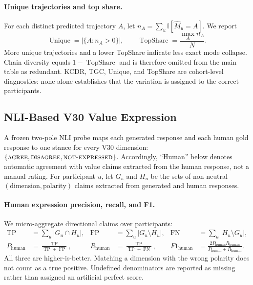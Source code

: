 \paragraph{Unique trajectories and top share.}
For each distinct predicted trajectory \(A\), let
\(n_A=\sum_u\mathbb I[\widehat M_u=A]\). We report
\begin{equation}
\operatorname{Unique}=\left|\{A:n_A>0\}\right|,
\qquad
\operatorname{TopShare}=\frac{\max_A n_A}{N}.
\label{eq:unique_topshare}
\end{equation}
More unique trajectories and a lower TopShare indicate less exact mode
collapse. Chain diversity equals \(1-\operatorname{TopShare}\) and is
therefore omitted from the main table as redundant. KCDR, TGC, Unique, and
TopShare are cohort-level diagnostics: none alone establishes that the
variation is assigned to the correct participants.

\subsection{NLI-Based V30 Value Expression}

A frozen two-pole NLI probe maps each generated response and each human gold
response to one stance for every V30 dimension:
\(\{\textsc{agree},\textsc{disagree},\textsc{not-expressed}\}\).
Accordingly, ``Human'' below denotes automatic agreement with value claims
extracted from the human response, not a manual rating. For participant \(u\),
let \(G_u\) and \(H_u\) be the sets of non-neutral
\((\text{dimension},\text{polarity})\) claims extracted from generated and
human responses.

\paragraph{Human expression precision, recall, and F1.}
We micro-aggregate directional claims over participants:
\begin{align}
\operatorname{TP}&=\sum_u|G_u\cap H_u|, &
\operatorname{FP}&=\sum_u|G_u\setminus H_u|, &
\operatorname{FN}&=\sum_u|H_u\setminus G_u|, \nonumber\\
P_{\mathrm{human}}&=\frac{\operatorname{TP}}
{\operatorname{TP}+\operatorname{FP}},&
R_{\mathrm{human}}&=\frac{\operatorname{TP}}
{\operatorname{TP}+\operatorname{FN}},&
F1_{\mathrm{human}}&=\frac{2P_{\mathrm{human}}R_{\mathrm{human}}}
{P_{\mathrm{human}}+R_{\mathrm{human}}}.
\label{eq:human_expression_prf}
\end{align}
All three are higher-is-better. Matching a dimension with the wrong polarity
does not count as a true positive. Undefined denominators are reported as
missing rather than assigned an artificial perfect score.

